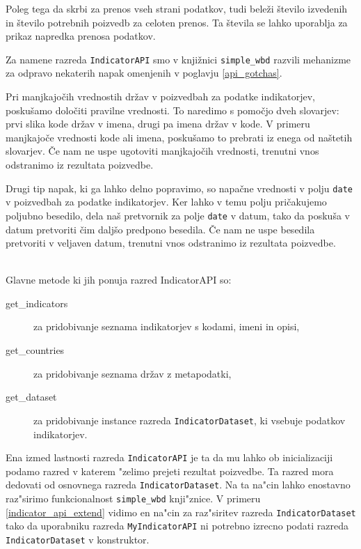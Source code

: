 Poleg tega da skrbi za prenos vseh strani podatkov, tudi beleži število 
izvedenih in število potrebnih poizvedb za celoten prenos. Ta števila se
lahko uporablja za prikaz napredka prenosa podatkov.


Za namene razreda \verb|IndicatorAPI| smo v knjižnici \verb|simple_wbd|
razvili mehanizme za odpravo nekaterih napak omenjenih v poglavju 
\ref{api_gotchas}.

Pri manjkajočih vrednostih držav v poizvedbah za podatke indikatorjev,
poskušamo določiti pravilne vrednosti. To naredimo s pomočjo dveh
slovarjev: prvi slika kode držav v imena, drugi pa imena držav v kode. V
primeru manjkajoče vrednosti kode ali imena, poskušamo to prebrati iz enega
od naštetih slovarjev. Če nam ne uspe ugotoviti manjkajočih vrednosti,
trenutni vnos odstranimo iz rezultata poizvedbe.

Drugi tip napak, ki ga lahko delno popravimo, so napačne vrednosti v polju
\verb|date| v poizvedbah za podatke indikatorjev. Ker lahko v temu polju
pričakujemo poljubno besedilo, dela naš pretvornik za polje \verb|date| v 
datum, tako da poskuša v datum pretvoriti čim daljšo predpono besedila.
Če nam ne uspe besedila pretvoriti v veljaven datum, trenutni vnos odstranimo
iz rezultata poizvedbe.


\ \\
Glavne metode ki jih ponuja razred IndicatorAPI so:

\begin{description}  
\item [get\_indicators] za pridobivanje seznama indikatorjev s kodami, imeni
      in opisi,
\item [get\_countries] za pridobivanje seznama držav z metapodatki,
\item [get\_dataset] za pridobivanje instance razreda \verb|IndicatorDataset|,
      ki vsebuje podatkov indikatorjev.
\end{description}

Ena izmed lastnosti razreda \verb|IndicatorAPI| je ta da mu lahko ob
inicializaciji podamo razred v katerem "zelimo prejeti rezultat poizvedbe. Ta
razred mora dedovati od osnovnega razreda \verb|IndicatorDataset|. Na ta
na"cin lahko enostavno raz"sirimo funkcionalnost \verb|simple_wbd| knji"znice.
V primeru \ref{indicator_api_extend} vidimo en na"cin za raz"siritev razreda 
\verb|IndicatorDataset| tako da uporabniku razreda \verb|MyIndicatorAPI| ni
potrebno izrecno podati razreda \verb|IndicatorDataset| v konstruktor.

